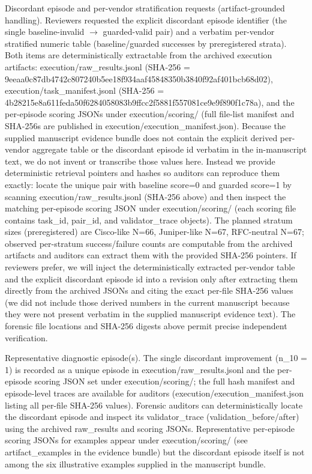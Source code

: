 \documentclass[conference]{IEEEtran}
\begin{document}
Discordant episode and per-vendor stratification requests (artifact-grounded handling). Reviewers requested the explicit discordant episode identifier (the single baseline-invalid \ensuremath{\rightarrow} guarded-valid pair) and a verbatim per-vendor stratified numeric table (baseline/guarded successes by preregistered strata). Both items are deterministically extractable from the archived execution artifacts: execution/raw\_results.jsonl (SHA-256 = 9eeaa0c87db4742c807240b5ee18f934aaf45848350b3840f92af401bcb68d02), execution/task\_manifest.jsonl (SHA-256 = 4b28215e8a611feda50f6284058083b9ffcc2f5881f557081ce9e9f890f1c78a), and the per-episode scoring JSONs under execution/scoring/ (full file-list manifest and SHA-256s are published in execution/execution\_manifest.json). Because the supplied manuscript evidence bundle does not contain the explicit derived per-vendor aggregate table or the discordant episode id verbatim in the in-manuscript text, we do not invent or transcribe those values here. Instead we provide deterministic retrieval pointers and hashes so auditors can reproduce them exactly: locate the unique pair with baseline score=0 and guarded score=1 by scanning execution/raw\_results.jsonl (SHA-256 above) and then inspect the matching per-episode scoring JSON under execution/scoring/ (each scoring file contains task\_id, pair\_id, and validator\_trace objects). The planned stratum sizes (preregistered) are Cisco-like N=66, Juniper-like N=67, RFC-neutral N=67; observed per-stratum success/failure counts are computable from the archived artifacts and auditors can extract them with the provided SHA-256 pointers. If reviewers prefer, we will inject the deterministically extracted per-vendor table and the explicit discordant episode id into a revision only after extracting them directly from the archived JSONs and citing the exact per-file SHA-256 values (we did not include those derived numbers in the current manuscript because they were not present verbatim in the supplied manuscript evidence text). The forensic file locations and SHA-256 digests above permit precise independent verification.

Representative diagnostic episode(s). The single discordant improvement (n\_10 = 1) is recorded as a unique episode in execution/raw\_results.jsonl and the per-episode scoring JSON set under execution/scoring/; the full hash manifest and episode-level traces are available for auditors (execution/execution\_manifest.json listing all per-file SHA-256 values). Forensic auditors can deterministically locate the discordant episode and inspect its validator\_trace (validation\_before/after) using the archived raw\_results and scoring JSONs. Representative per-episode scoring JSONs for examples appear under execution/scoring/ (see artifact\_examples in the evidence bundle) but the discordant episode itself is not among the six illustrative examples supplied in the manuscript bundle.
\end{document}
